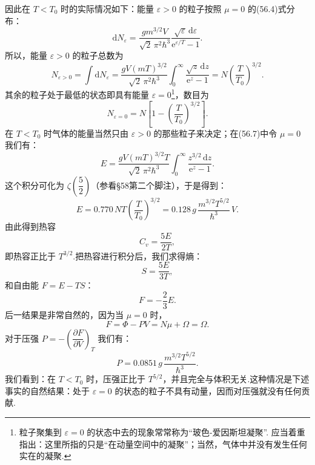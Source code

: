因此在 $T<T_0$ 时的实际情况如下：能量 $\varepsilon>0$ 的粒子按照 $\mu=0$ 的(56.4)式分布：
\begin{equation}
  \mathrm{d}N_\varepsilon=\frac{gm^{3/2}V}{\sqrt{2}\,\pi^2\hbar^3}
  \frac{\sqrt{\varepsilon}\,\mathrm{d}\varepsilon}{\mathrm{e}^{\varepsilon/T}-1}.
\end{equation}
所以，能量 $\varepsilon>0$ 的粒子总数为
\begin{equation*}
  N_{\varepsilon>0}=\int\mathrm{d}N_\varepsilon
  =\frac{gV(mT)^{3/2}}{\sqrt{2}\,\pi^2\hbar^3}\int_0^{\infty}
  \frac{\sqrt{z}\,\mathrm{d}z}{\mathrm{e}^z-1}
  =N\left(\frac{T}{T_0}\right)^{3/2}.
\end{equation*}
其余的粒子处于最低的状态即具有能量 $\varepsilon=0$\footnote{粒子聚集到 $\varepsilon=0$ 的状态中去的现象常常称为“玻色-爱因斯坦凝聚”. 应当着重指出：这里所指的只是“在动量空间中的凝聚”；当然，气体中并没有发生任何实在的凝聚.}，数目为
\begin{equation}
  N_{\varepsilon=0}=N\left[1-\left(\frac{T}{T_0}\right)^{3/2}\right].
\end{equation}
在 $T<T_0$ 时气体的能量当然只由 $\varepsilon>0$ 的那些粒子来决定；在(56.7)中令 $\mu=0$ 我们有：
\begin{equation*}
  E=\frac{gV(mT)^{3/2}T}{\sqrt{2}\,\pi^2\hbar^3}\int_0^{\infty}
  \frac{z^{3/2}\,\mathrm{d}z}{\mathrm{e}^z-1}.
\end{equation*}
这个积分可化为 $\zeta\left(\dfrac{5}{2}\right)$（参看§58第二个脚注），于是得到：
\begin{equation}
  E=0.770\,NT\left(\frac{T}{T_0}\right)^{3/2}
  =0.128\,g\,\frac{m^{3/2}T^{5/2}}{\hbar^3}\,V.
\end{equation}
由此得到热容
\begin{equation}
  C_v=\frac{5E}{2T},
\end{equation}
即热容正比于 $T^{3/2}$.把热容进行积分后，我们求得熵：
\begin{equation}
  S=\frac{5E}{3T},
\end{equation}
和自由能 $F=E-TS$：
\begin{equation}
  F=-\frac{2}{3}E.
\end{equation}
后一结果是非常自然的，因为当 $\mu=0$ 时，
\begin{equation*}
  F=\varPhi-PV=N\mu+\Omega=\Omega.
\end{equation*}
对于压强 $P=-\left(\dfrac{\partial F}{\partial V}\right)_T$ 我们有：
\begin{equation}
  P=0.0851\,g\,\frac{m^{3/2}T^{5/2}}{\hbar^3}.
\end{equation}
我们看到：在 $T<T_0$ 时，压强正比于 $T^{5/2}$，并且完全与体积无关.这种情况是下述事实的自然结果：处于 $\varepsilon=0$ 的状态的粒子不具有动量，因而对压强就没有任何贡献.

